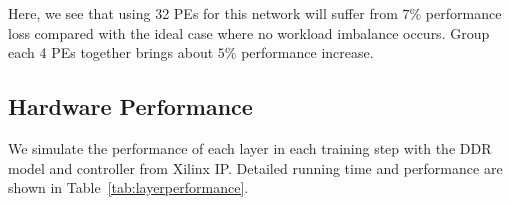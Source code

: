Here, we see that using 32 PEs for this network will suffer from $7\%$ performance loss compared with the ideal case where no workload imbalance occurs. Group each 4 PEs together brings about $5\%$ performance increase. %


\subsection{Hardware Performance}
We simulate the performance of each layer in each training step with the DDR model and controller from Xilinx IP. Detailed running time and performance are shown in Table~\ref{tab:layerperformance}.


